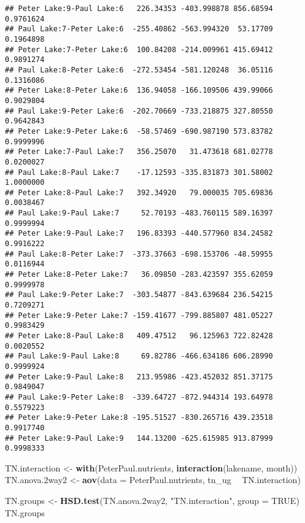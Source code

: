 \documentclass[
]{article}
\newenvironment{Shaded}{\begin{snugshade}}{\end{snugshade}}
\newcommand{\DataTypeTok}[1]{\textcolor[rgb]{0.13,0.29,0.53}{#1}}
\newcommand{\FloatTok}[1]{\textcolor[rgb]{0.00,0.00,0.81}{#1}}
\newcommand{\KeywordTok}[1]{\textcolor[rgb]{0.13,0.29,0.53}{\textbf{#1}}}
\newcommand{\NormalTok}[1]{#1}
\newcommand{\OperatorTok}[1]{\textcolor[rgb]{0.81,0.36,0.00}{\textbf{#1}}}
\newcommand{\OtherTok}[1]{\textcolor[rgb]{0.56,0.35,0.01}{#1}}
\newcommand{\StringTok}[1]{\textcolor[rgb]{0.31,0.60,0.02}{#1}}
\begin{document}
\begin{verbatim}
## Peter Lake:9-Paul Lake:6   226.34353 -403.998878 856.68594 0.9761624
## Paul Lake:7-Peter Lake:6  -255.40862 -563.994320  53.17709 0.1964898
## Peter Lake:7-Peter Lake:6  100.84208 -214.009961 415.69412 0.9891274
## Paul Lake:8-Peter Lake:6  -272.53454 -581.120248  36.05116 0.1316086
## Peter Lake:8-Peter Lake:6  136.94058 -166.109506 439.99066 0.9029804
## Paul Lake:9-Peter Lake:6  -202.70669 -733.218875 327.80550 0.9642843
## Peter Lake:9-Peter Lake:6  -58.57469 -690.987190 573.83782 0.9999996
## Peter Lake:7-Paul Lake:7   356.25070   31.473618 681.02778 0.0200027
## Paul Lake:8-Paul Lake:7    -17.12593 -335.831873 301.58002 1.0000000
## Peter Lake:8-Paul Lake:7   392.34920   79.000035 705.69836 0.0038467
## Paul Lake:9-Paul Lake:7     52.70193 -483.760115 589.16397 0.9999994
## Peter Lake:9-Paul Lake:7   196.83393 -440.577960 834.24582 0.9916222
## Paul Lake:8-Peter Lake:7  -373.37663 -698.153706 -48.59955 0.0116944
## Peter Lake:8-Peter Lake:7   36.09850 -283.423597 355.62059 0.9999978
## Paul Lake:9-Peter Lake:7  -303.54877 -843.639684 236.54215 0.7209271
## Peter Lake:9-Peter Lake:7 -159.41677 -799.885807 481.05227 0.9983429
## Peter Lake:8-Paul Lake:8   409.47512   96.125963 722.82428 0.0020552
## Paul Lake:9-Paul Lake:8     69.82786 -466.634186 606.28990 0.9999924
## Peter Lake:9-Paul Lake:8   213.95986 -423.452032 851.37175 0.9849047
## Paul Lake:9-Peter Lake:8  -339.64727 -872.944314 193.64978 0.5579223
## Peter Lake:9-Peter Lake:8 -195.51527 -830.265716 439.23518 0.9917740
## Peter Lake:9-Paul Lake:9   144.13200 -625.615985 913.87999 0.9998333
\end{verbatim}

\begin{Shaded}
\begin{Highlighting}[]
\NormalTok{TN.interaction <-}\StringTok{ }\KeywordTok{with}\NormalTok{(PeterPaul.nutrients, }\KeywordTok{interaction}\NormalTok{(lakename, month))}
\NormalTok{TN.anova}\FloatTok{.2}\NormalTok{way2 <-}\StringTok{ }\KeywordTok{aov}\NormalTok{(}\DataTypeTok{data =}\NormalTok{ PeterPaul.nutrients, tn_ug }\OperatorTok{~}\StringTok{ }\NormalTok{TN.interaction)}

\NormalTok{TN.groups <-}\StringTok{ }\KeywordTok{HSD.test}\NormalTok{(TN.anova}\FloatTok{.2}\NormalTok{way2, }\StringTok{"TN.interaction"}\NormalTok{, }\DataTypeTok{group =} \OtherTok{TRUE}\NormalTok{)}
\NormalTok{TN.groups}
\end{Highlighting}
\end{Shaded}
\end{document}
